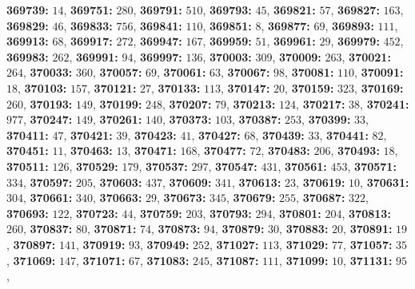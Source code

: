 \textsf{\bfseries 369739:} $14$, \textsf{\bfseries 369751:} $280$, \textsf{\bfseries 369791:} $510$, \textsf{\bfseries 369793:} $45$, \textsf{\bfseries 369821:} $57$, \textsf{\bfseries 369827:} $163$, \textsf{\bfseries 369829:} $46$, \textsf{\bfseries 369833:} $756$, \textsf{\bfseries 369841:} $110$, \textsf{\bfseries 369851:} $8$, \textsf{\bfseries 369877:} $69$, \textsf{\bfseries 369893:} $111$, \textsf{\bfseries 369913:} $68$, \textsf{\bfseries 369917:} $272$, \textsf{\bfseries 369947:} $167$, \textsf{\bfseries 369959:} $51$, \textsf{\bfseries 369961:} $29$, \textsf{\bfseries 369979:} $452$, \textsf{\bfseries 369983:} $262$, \textsf{\bfseries 369991:} $94$, \textsf{\bfseries 369997:} $136$, \textsf{\bfseries 370003:} $309$, \textsf{\bfseries 370009:} $263$, \textsf{\bfseries 370021:} $264$, \textsf{\bfseries 370033:} $360$, \textsf{\bfseries 370057:} $69$, \textsf{\bfseries 370061:} $63$, \textsf{\bfseries 370067:} $98$, \textsf{\bfseries 370081:} $110$, \textsf{\bfseries 370091:} $18$, \textsf{\bfseries 370103:} $157$, \textsf{\bfseries 370121:} $27$, \textsf{\bfseries 370133:} $113$, \textsf{\bfseries 370147:} $20$, \textsf{\bfseries 370159:} $323$, \textsf{\bfseries 370169:} $260$, \textsf{\bfseries 370193:} $149$, \textsf{\bfseries 370199:} $248$, \textsf{\bfseries 370207:} $79$, \textsf{\bfseries 370213:} $124$, \textsf{\bfseries 370217:} $38$, \textsf{\bfseries 370241:} $977$, \textsf{\bfseries 370247:} $149$, \textsf{\bfseries 370261:} $140$, \textsf{\bfseries 370373:} $103$, \textsf{\bfseries 370387:} $253$, \textsf{\bfseries 370399:} $33$, \textsf{\bfseries 370411:} $47$, \textsf{\bfseries 370421:} $39$, \textsf{\bfseries 370423:} $41$, \textsf{\bfseries 370427:} $68$, \textsf{\bfseries 370439:} $33$, \textsf{\bfseries 370441:} $82$, \textsf{\bfseries 370451:} $11$, \textsf{\bfseries 370463:} $13$, \textsf{\bfseries 370471:} $168$, \textsf{\bfseries 370477:} $72$, \textsf{\bfseries 370483:} $206$, \textsf{\bfseries 370493:} $18$, \textsf{\bfseries 370511:} $126$, \textsf{\bfseries 370529:} $179$, \textsf{\bfseries 370537:} $297$, \textsf{\bfseries 370547:} $431$, \textsf{\bfseries 370561:} $453$, \textsf{\bfseries 370571:} $334$, \textsf{\bfseries 370597:} $205$, \textsf{\bfseries 370603:} $437$, \textsf{\bfseries 370609:} $341$, \textsf{\bfseries 370613:} $23$, \textsf{\bfseries 370619:} $10$, \textsf{\bfseries 370631:} $304$, \textsf{\bfseries 370661:} $340$, \textsf{\bfseries 370663:} $29$, \textsf{\bfseries 370673:} $345$, \textsf{\bfseries 370679:} $255$, \textsf{\bfseries 370687:} $322$, \textsf{\bfseries 370693:} $122$, \textsf{\bfseries 370723:} $44$, \textsf{\bfseries 370759:} $203$, \textsf{\bfseries 370793:} $294$, \textsf{\bfseries 370801:} $204$, \textsf{\bfseries 370813:} $260$, \textsf{\bfseries 370837:} $80$, \textsf{\bfseries 370871:} $74$, \textsf{\bfseries 370873:} $94$, \textsf{\bfseries 370879:} $30$, \textsf{\bfseries 370883:} $20$, \textsf{\bfseries 370891:} $19$, \textsf{\bfseries 370897:} $141$, \textsf{\bfseries 370919:} $93$, \textsf{\bfseries 370949:} $252$, \textsf{\bfseries 371027:} $113$, \textsf{\bfseries 371029:} $77$, \textsf{\bfseries 371057:} $35$, \textsf{\bfseries 371069:} $147$, \textsf{\bfseries 371071:} $67$, \textsf{\bfseries 371083:} $245$, \textsf{\bfseries 371087:} $111$, \textsf{\bfseries 371099:} $10$, \textsf{\bfseries 371131:} $95$, 

